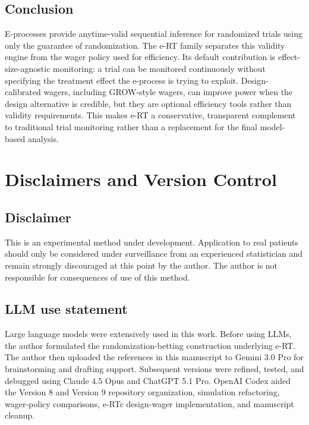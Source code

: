 \documentclass[10pt]{article}
\begin{document}
\subsection{Conclusion}

E-processes provide anytime-valid sequential inference for randomized trials using only the guarantee of randomization. The e-RT family separates this validity engine from the wager policy used for efficiency. Its default contribution is effect-size-agnostic monitoring: a trial can be monitored continuously without specifying the treatment effect the e-process is trying to exploit. Design-calibrated wagers, including GROW-style wagers, can improve power when the design alternative is credible, but they are optional efficiency tools rather than validity requirements. This makes e-RT a conservative, transparent complement to traditional trial monitoring rather than a replacement for the final model-based analysis.

\section{Disclaimers and Version Control}

\subsection{Disclaimer}

This is an experimental method under development. Application to real patients should only be considered under surveillance from an experienced statistician and remain strongly discouraged at this point by the author. The author is not responsible for consequences of use of this method.

\subsection{LLM use statement}

Large language models were extensively used in this work. Before using LLMs, the author formulated the randomization-betting construction underlying e-RT. The author then uploaded the references in this manuscript to Gemini 3.0 Pro for brainstorming and drafting support. Subsequent versions were refined, tested, and debugged using Claude 4.5 Opus and ChatGPT 5.1 Pro. OpenAI Codex aided the Version 8 and Version 9 repository organization, simulation refactoring, wager-policy comparisons, e-RTc design-wager implementation, and manuscript cleanup.
\end{document}
